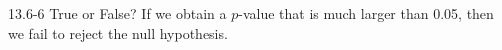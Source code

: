\begin{exsol@exercise}{13.6-6}
True or False? If we obtain a $p$-value that is much larger than 0.05, then we fail to reject the null hypothesis.

\end{exsol@exercise}
